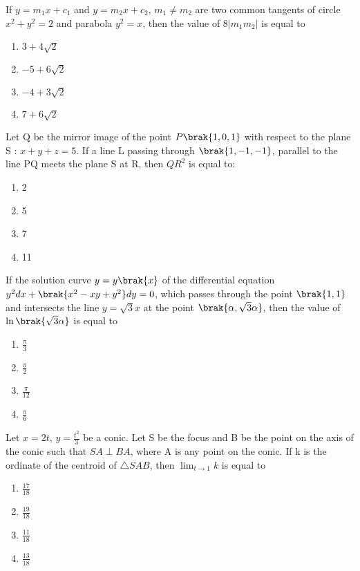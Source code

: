 \iffalse
\title{Assignment-4}
\author{EE24BTECH11048-NITHIN.K}
\section{mcq-single}
\fi
\item If $y = m_1x + c_1$ and $y = m_2x + c_2$, $m_1 \neq m_2$ are two common tangents of circle $x^2+y^2=2$ and parabola $y^2=x$, then the value of $8|m_1m_2|$ is equal to
	\begin{enumerate}
		\item $3+4\sqrt{2}$
		\item $-5+6\sqrt{2}$
		\item $-4+3\sqrt{2}$
		\item $7+6\sqrt{2}$
	\end{enumerate}
\item Let Q be the mirror image of the point $P\brak{1,0,1}$ with respect to the plane S : $x+y+z=5$. If a line L passing through $\brak{1,-1,-1}$, parallel to the line PQ meets the plane S at R, then $QR^2$ is equal to:
	\begin{enumerate}
		\item 2
		\item 5
		\item 7
		\item 11
	\end{enumerate}
\item If the solution curve $y=y\brak{x}$ of the differential equation $y^2dx + \brak{x^2-xy+y^2}dy = 0$, which passes through the point $\brak{1,1}$ and intersects the line $y=\sqrt{3}x$ at the point $\brak{\alpha,\sqrt{3}\alpha}$, then the value of $\ln\brak{\sqrt{3}\alpha}$ is equal to
	\begin{enumerate}
		\item $\frac{\pi}{3}$
		\item $\frac{\pi}{2}$
		\item $\frac{\pi}{12}$
		\item $\frac{\pi}{6}$
	\end{enumerate}
\item Let $x=2t$, $y=\frac{t^2}{3}$ be a conic. Let S be the focus and B be the point on the axis of the conic such that $SA \perp BA$, where A is any point on the conic. If k is the ordinate of the centroid of $\triangle SAB$, then $\lim_{t \to 1}{k}$ is equal to
	\begin{enumerate}
		\item $\frac{17}{18}$
		\item $\frac{19}{18}$
		\item $\frac{11}{18}$
		\item $\frac{13}{18}$
	\end{enumerate}

